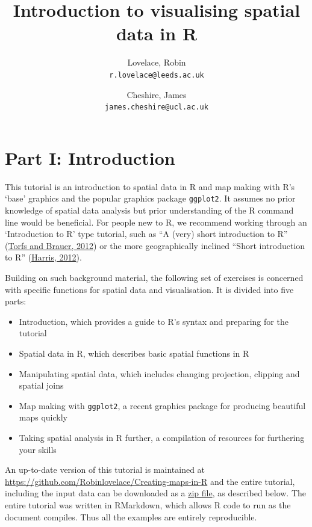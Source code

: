 \documentclass[]{article}
\author{Lovelace, Robin\\
\texttt{r.lovelace@leeds.ac.uk}
\and
Cheshire, James\\
\texttt{james.cheshire@ucl.ac.uk}
}
\title{Introduction to visualising spatial data in R}
\begin{document}
\maketitle

\tableofcontents
\section{Part I: Introduction}

This tutorial is an introduction to spatial data in R and map making
with R's `base' graphics and the popular graphics package
\texttt{ggplot2}. It assumes no prior knowledge of spatial data analysis
but prior understanding of the R command line would be beneficial. For
people new to R, we recommend working through an `Introduction to R'
type tutorial, such as ``A (very) short introduction to R''
(\href{http://cran.r-project.org/doc/contrib/Torfs+Brauer-Short-R-Intro.pdf}{Torfs
and Brauer, 2012}) or the more geographically inclined ``Short
introduction to R''
(\href{http://www.social-statistics.org/wp-content/uploads/2012/12/intro\_to\_R1.pdf}{Harris,
2012}).

Building on such background material, the following set of exercises is
concerned with specific functions for spatial data and visualisation. It
is divided into five parts:

\begin{itemize}
\item
  Introduction, which provides a guide to R's syntax and preparing for
  the tutorial
\item
  Spatial data in R, which describes basic spatial functions in R
\item
  Manipulating spatial data, which includes changing projection,
  clipping and spatial joins
\item
  Map making with \texttt{ggplot2}, a recent graphics package for
  producing beautiful maps quickly
\item
  Taking spatial analysis in R further, a compilation of resources for
  furthering your skills
\end{itemize}
An up-to-date version of this tutorial is maintained at
\href{https://github.com/Robinlovelace/Creating-maps-in-R/blob/master/intro-spatial-rl.pdf}{https://github.com/Robinlovelace/Creating-maps-in-R}
and the entire tutorial, including the input data can be downloaded as a
\href{https://github.com/Robinlovelace/Creating-maps-in-R/archive/master.zip}{zip
file}, as described below. The entire tutorial was written in RMarkdown,
which allows R code to run as the document compiles. Thus all the
examples are entirely reproducible.
\end{document}
